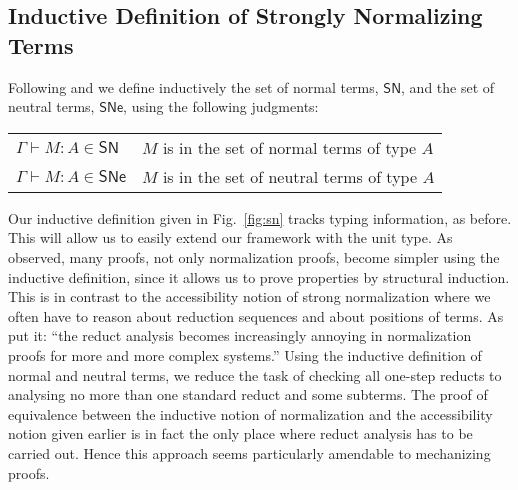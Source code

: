 \documentclass{article}
\newcommand{\SN}{\mathsf{SN}}
\newcommand{\SNe}{\mathsf{SNe}}
\begin{document}
\subsection{Inductive Definition of Strongly Normalizing Terms}
Following \cite{Raamsdonk_onnormalisation} and \cite{Joachimski2003} we define inductively the set of normal terms, $\SN$, and the set of neutral terms, $\SNe$, using the following judgments:
\\%

\begin{center}
\begin{tabular}{ll}
$\Gamma \vdash M : A \in \SN$  & $M$ is in the set of normal terms of  type $A$\\
$\Gamma \vdash M : A \in \SNe$ & $M$ is in the set of neutral terms of type $A$
\end{tabular}
\end{center}

Our inductive definition given in Fig.~\ref{fig:sn} tracks typing information, as before. This will allow us to easily extend our framework with the unit type.
As \cite{Raamsdonk_onnormalisation} observed, many proofs, not only normalization proofs, become simpler using the inductive definition, since it allows us  to prove properties by structural induction. This is in contrast to the accessibility notion of strong normalization where we often have to reason about reduction sequences and about positions of terms. As \cite{Joachimski2003}  put it: ``the reduct analysis becomes increasingly annoying in normalization proofs for more and more complex systems.'' Using the inductive definition of normal and neutral terms, we reduce the task of checking all one-step reducts to analysing no more than one standard reduct
and some subterms.  The proof of equivalence between the inductive notion of normalization and the accessibility notion given earlier is in fact the only place where reduct analysis has to be carried out.
Hence this approach seems particularly amendable to mechanizing proofs.

\end{document}
